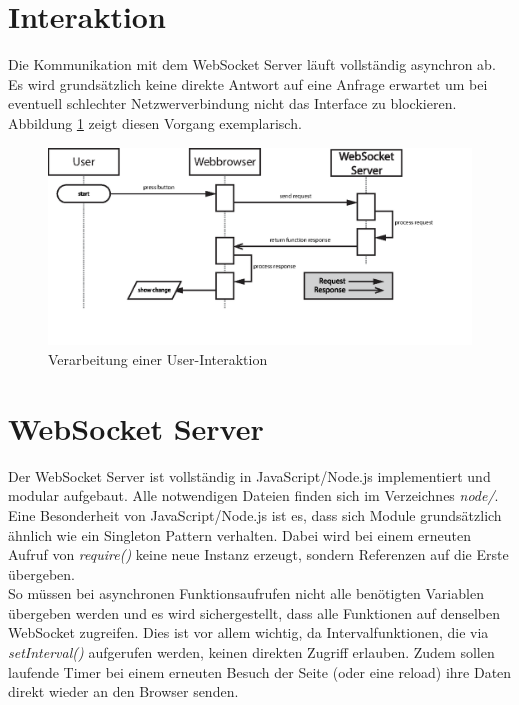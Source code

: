 \section{Interaktion}
Die Kommunikation mit dem WebSocket Server läuft vollständig asynchron ab. Es wird grundsätzlich keine direkte Antwort auf eine Anfrage erwartet um bei eventuell schlechter Netzwerverbindung nicht das Interface zu blockieren. Abbildung \ref{fig:interaction} zeigt diesen Vorgang exemplarisch.

\begin{figure}[ht]
  \includegraphics[width = \textwidth]{documentation/images/sendRequest.eps}
  \caption{Verarbeitung einer User-Interaktion}
  \label{fig:interaction}
\end{figure}


\section{WebSocket Server}
Der WebSocket Server ist vollständig in JavaScript/Node.js implementiert und modular aufgebaut. Alle notwendigen Dateien finden sich im Verzeichnes \textit{node/}.\\
Eine Besonderheit von JavaScript/Node.js ist es, dass sich Module grundsätzlich ähnlich wie ein Singleton Pattern verhalten. Dabei wird bei einem erneuten Aufruf von \textit{require()} keine neue Instanz erzeugt, sondern Referenzen auf die Erste übergeben.\\
So müssen bei asynchronen Funktionsaufrufen nicht alle benötigten Variablen übergeben werden und es wird sichergestellt, dass alle Funktionen auf denselben WebSocket zugreifen. Dies ist vor allem wichtig, da Intervalfunktionen, die via \textit{setInterval()} aufgerufen werden, keinen direkten Zugriff erlauben. Zudem sollen laufende Timer bei einem erneuten Besuch der Seite (oder eine reload) ihre Daten direkt wieder an den Browser senden.

